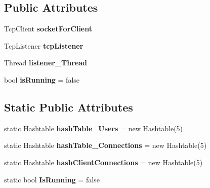 \subsection*{Public Attributes}
\begin{DoxyCompactItemize}
\item 
\hypertarget{class_server_library_1_1_t_c_p_server_abeb93a27ff1d1e3b5a61b6bd52c89cac}{
TcpClient {\bfseries socketForClient}}
\label{class_server_library_1_1_t_c_p_server_abeb93a27ff1d1e3b5a61b6bd52c89cac}

\item 
\hypertarget{class_server_library_1_1_t_c_p_server_a00ec31b4b7b684d95edb498111bdbbb7}{
TcpListener {\bfseries tcpListener}}
\label{class_server_library_1_1_t_c_p_server_a00ec31b4b7b684d95edb498111bdbbb7}

\item 
\hypertarget{class_server_library_1_1_t_c_p_server_aa338015aa3d159adf091a0849919ed67}{
Thread {\bfseries listener\_\-Thread}}
\label{class_server_library_1_1_t_c_p_server_aa338015aa3d159adf091a0849919ed67}

\item 
\hypertarget{class_server_library_1_1_t_c_p_server_a916f5e9226e47af757726848c8693462}{
bool {\bfseries isRunning} = false}
\label{class_server_library_1_1_t_c_p_server_a916f5e9226e47af757726848c8693462}

\end{DoxyCompactItemize}
\subsection*{Static Public Attributes}
\begin{DoxyCompactItemize}
\item 
\hypertarget{class_server_library_1_1_t_c_p_server_a78a9757b60b3e3749555ea2aa64798f5}{
static Hashtable {\bfseries hashTable\_\-Users} = new Hashtable(5)}
\label{class_server_library_1_1_t_c_p_server_a78a9757b60b3e3749555ea2aa64798f5}

\item 
\hypertarget{class_server_library_1_1_t_c_p_server_a8795135c3c26e6e2c1a3702e86d913df}{
static Hashtable {\bfseries hashTable\_\-Connections} = new Hashtable(5)}
\label{class_server_library_1_1_t_c_p_server_a8795135c3c26e6e2c1a3702e86d913df}

\item 
\hypertarget{class_server_library_1_1_t_c_p_server_af8f27276c4b04597504dea3285dd6aa5}{
static Hashtable {\bfseries hashClientConnections} = new Hashtable(5)}
\label{class_server_library_1_1_t_c_p_server_af8f27276c4b04597504dea3285dd6aa5}

\item 
\hypertarget{class_server_library_1_1_t_c_p_server_ad54e1c155c2122e6b59c7c107ce883d4}{
static bool {\bfseries IsRunning} = false}
\label{class_server_library_1_1_t_c_p_server_ad54e1c155c2122e6b59c7c107ce883d4}

\end{DoxyCompactItemize}
